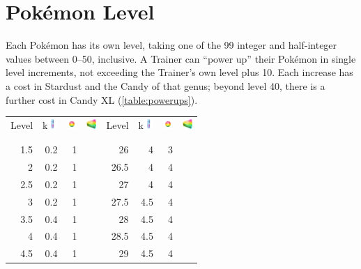 \section{Pokémon Level}
\label{sec:plevel}
Each Pokémon has its own level, taking one of the 99 integer and half-integer
 values between 0--50, inclusive.
A Trainer can ``power up'' their Pokémon in single level increments,
 not exceeding the Trainer's own level plus 10.
Each increase has a cost in Stardust and the Candy of that genus; beyond level 40, there
  is a further cost in Candy XL (\autoref{table:powerups}).
\begin{table}
  \footnotesize
  \begin{center}
    \begin{tabular}[ht]{rrrr|rrrr}
      Level &
        k\includegraphics[width=1em,height=1em]{images/stardust.png} &
        \includegraphics[width=1em,height=1em]{images/rarecandy.png} &
        \includegraphics[width=1em,height=1em]{images/rarecandyxl.png} &
      Level &
        k\includegraphics[width=1em,height=1em]{images/stardust.png} &
        \includegraphics[width=1em,height=1em]{images/rarecandy.png} &
        \includegraphics[width=1em,height=1em]{images/rarecandyxl.png} \\
      \Midrule\\\\
      1.5 & 0.2 & 1 & &   26 &   4 &  3 & \\
        2 & 0.2 & 1 & & 26.5 &   4 &  4 & \\
      2.5 & 0.2 & 1 & &   27 &   4 &  4 & \\
        3 & 0.2 & 1 & & 27.5 & 4.5 &  4 & \\
      3.5 & 0.4 & 1 & &   28 & 4.5 &  4 & \\
        4 & 0.4 & 1 & & 28.5 & 4.5 &  4 & \\
      4.5 & 0.4 & 1 & &   29 & 4.5 &  4 & \\

\end{tabular}
\end{center}
\end{table}

